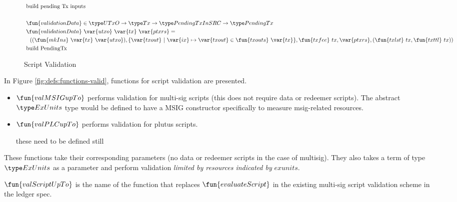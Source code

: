 \begin{figure*}[htb]
\begin{align*}
    & \text{build pending Tx inputs} \\~\\
    & \fun{validationData} \in \UTxO \to \Tx \to \PendingTxInSRC \to \PendingTx \\
    & \fun{validationData}~\var{utxo}~\var{tx}~\var{ptxrs} = \\ &
    ~~ ((\fun{mkIns}~\var{tx}~\var{utxo}),\{ \var{txout}~\vert~ \var{ix} \mapsto \var{txout} \in \fun{txouts}~\var{tx}\},
    \fun{txfee}~{tx},\var{ptxrs},(\fun{txlst}~{tx},\fun{txttl}~{tx})) \\
    & \text{build PendingTx} \\
  \end{align*}
  \caption{Script Validation}
  \label{fig:defs:functions-helper}
\end{figure*}


In Figure \ref{fig:defs:functions-valid}, functions for script validation
are presented.

\begin{itemize}
  \item $\fun{valMSIGupTo}$ performs validation for multi-sig scripts
  (this does not require data or redeemer scripts). The abstract $\ExUnits$
  type would be defined to have a MSIG constructor specifically to
  measure msig-related resources.
  \item $\fun{valPLCupTo}$ performs validation for plutus scripts.
  \begin{note}
    these need to be defined still
  \end{note}
\end{itemize}

These functions take their corresponding parameters (no data or redeemer
scripts in the case of multisig). They also
takes a term of type $\ExUnits$ as a parameter and perform validation
\textit{limited by resources indicated by} $exunits$.

\begin{note}
  $\fun{valScriptUpTo}$  is the name of the function that replaces
  $\fun{evaluateScript}$ in the existing multi-sig script validation
  scheme in the ledger spec.
\end{note}

